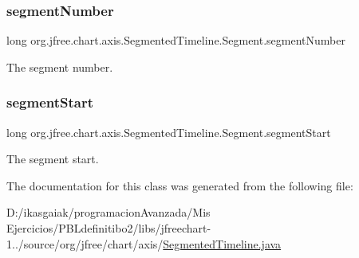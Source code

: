 \subsubsection{\texorpdfstring{segment\+Number}{segmentNumber}}
{\footnotesize\ttfamily long org.\+jfree.\+chart.\+axis.\+Segmented\+Timeline.\+Segment.\+segment\+Number\hspace{0.3cm}{\ttfamily [protected]}}

The segment number. \mbox{\label{classorg_1_1jfree_1_1chart_1_1axis_1_1_segmented_timeline_1_1_segment_aa0b41743532c266e3638b063555d2af5}} 
\subsubsection{\texorpdfstring{segment\+Start}{segmentStart}}
{\footnotesize\ttfamily long org.\+jfree.\+chart.\+axis.\+Segmented\+Timeline.\+Segment.\+segment\+Start\hspace{0.3cm}{\ttfamily [protected]}}

The segment start. 

The documentation for this class was generated from the following file\+:\begin{DoxyCompactItemize}
\item 
D\+:/ikasgaiak/programacion\+Avanzada/\+Mis Ejercicios/\+P\+B\+Ldefinitibo2/libs/jfreechart-\/1../source/org/jfree/chart/axis/\mbox{\hyperlink{_segmented_timeline_8java}{Segmented\+Timeline.\+java}}\end{DoxyCompactItemize}
